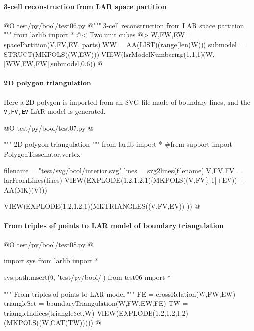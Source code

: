 \documentclass[11pt,oneside]{article}    %
\begin{document}
\paragraph{3-cell reconstruction from LAR space partition}
@O test/py/bool/test06.py
@{""" 3-cell reconstruction from LAR space partition """
from larlib import *
@< Two unit cubes @>
W,FW,EW = spacePartition(V,FV,EV, parts)
WW = AA(LIST)(range(len(W)))
submodel = STRUCT(MKPOLS((W,EW)))
VIEW(larModelNumbering(1,1,1)(W,[WW,EW,FW],submodel,0.6))
@}



\paragraph{2D polygon triangulation}
Here a 2D polygon is imported from an SVG file made of boundary lines, and the \texttt{V,FV,EV}
LAR model is generated. 

@O test/py/bool/test07.py
@{""" 2D polygon triangulation """
from larlib import *
#from support import PolygonTessellator,vertex

filename = "test/svg/bool/interior.svg"
lines = svg2lines(filename)    
V,FV,EV = larFromLines(lines)
VIEW(EXPLODE(1.2,1.2,1)(MKPOLS((V,FV[:-1]+EV)) + AA(MK)(V)))

VIEW(EXPLODE(1.2,1.2,1)(MKTRIANGLES((V,FV,EV)) ))
@}


\paragraph{From triples of points to LAR model of boundary triangulation}
    
@O test/py/bool/test08.py @{
import sys
from larlib import *

sys.path.insert(0, 'test/py/bool/')
from test06 import *

""" From triples of points to LAR model """
FE = crossRelation(W,FW,EW)
triangleSet = boundaryTriangulation(W,FW,EW,FE)
TW = triangleIndices(triangleSet,W)
VIEW(EXPLODE(1.2,1.2,1.2)(MKPOLS((W,CAT(TW)))))
@}
\end{document}
